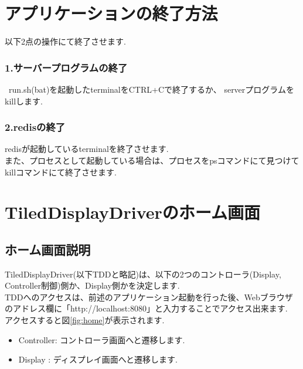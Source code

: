 \documentclass[a4paper,10pt,oneside]{jsbook}
\begin{document}
\chapter{アプリケーションの終了方法}

以下2点の操作にて終了させます.\\

\subsection{1.サーバープログラムの終了}\
run.sh(bat)を起動したterminalをCTRL+Cで終了するか、
serverプログラムをkillします.\\


\subsection{2.redisの終了}
redisが起動しているterminalを終了させます.\\
また、プロセスとして起動している場合は、プロセスをpsコマンドにて見つけて
killコマンドにて終了させます.\\

\newpage

\chapter{TiledDisplayDriverのホーム画面}
\section{ホーム画面説明}
TiledDisplayDriver(以下TDDと略記)は、以下の2つのコントローラ(Display, Controller制御)側か、Display側かを決定します.\\
TDDへのアクセスは、前述のアプリケーション起動を行った後、Webブラウザのアドレス欄に「http://localhost:8080」と入力することでアクセス出来ます.\\
アクセスすると図\ref{fig:home}が表示されます.

\begin{itemize}
\item Controller: コントローラ画面へと遷移します.\\
\item Display   : ディスプレイ画面へと遷移します.\\
\end{itemize}
\end{document}
